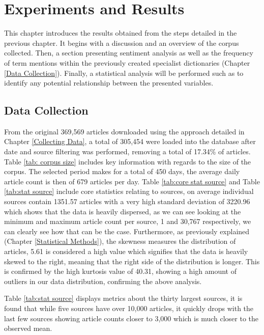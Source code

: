 \chapter{Experiments and Results}\label{Evalutation}

This chapter introduces the results obtained from the steps detailed in the previous chapter. It begins with a discussion and an overview of the corpus collected. Then, a section presenting sentiment analysis as well as the frequency of term mentions within the previously created specialist dictionaries (Chapter \ref{Data Collection}). Finally, a statistical analysis will be performed such as to identify any potential relationship between the presented variables. 

\section{Data Collection}

From the original 369,569 articles downloaded using the approach detailed in Chapter \ref{Collecting Data}, a total of 305,454 were loaded into the database after date and source filtering was performed, removing a total of 17.34\% of articles. Table \ref{tab: corpus size} includes key information with regards to  the size of the corpus. The selected period makes for a total of 450 days, the average daily article count is then of 679 articles per day. Table \ref{tab:core stat source} and Table \ref{tab:stat source} include core statistics relating to sources, on average individual sources contain 1351.57 articles with a very high standard deviation of 3220.96 which shows that the data is heavily dispersed, as we can see looking at the minimum and maximum article count per source, 1 and 30,767 respectively, we can clearly see how that can be the case. Furthermore, as previously explained (Chapter \ref{Statistical Methods}), the skewness measures the distribution of articles, 5.61 is considered a high value which signifies that the data is heavily skewed to the right, meaning that the right side of the distribution is longer. This is confirmed by the high kurtosis value of 40.31, showing a high amount of outliers in our data distribution, confirming the above analysis.

Table \ref{tab:stat source} displays metrics about the thirty largest sources, it is found that while five sources have over 10,000 articles, it quickly drops with the last few sources showing article counts closer to 3,000 which is much closer to the observed mean.

